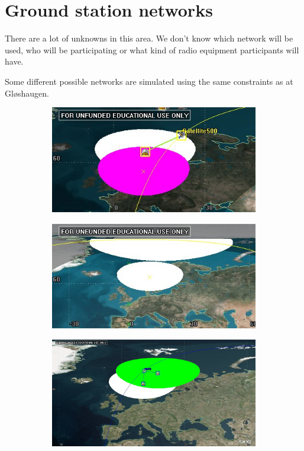 \section{Ground station networks}

There are a lot of unknowns in this area. We don't know which network will be used, who will be participating or what kind of radio equipment participants will have. 

Some different possible networks are simulated using the same constraints as at Gløshaugen.

\begin{figure}
\begin{subfigure}{.5\textwidth}
	\centering
	\includegraphics[width=\textwidth]{Figures/range_ntnu_aalborg}
	\label{fig:range_ntnu_aalborg}
\end{subfigure}
\begin{subfigure}{.5\textwidth}
	\centering
	\includegraphics[width=\textwidth]{Figures/range_ntnu_svalbard}
	\label{fig:range_ntnu_unis}
\end{subfigure}
\begin{subfigure}{.5\textwidth}
	\centering
	\includegraphics[width=\textwidth]{Figures/range_ntnu_narvik}

\end{subfigure}
\end{figure}

